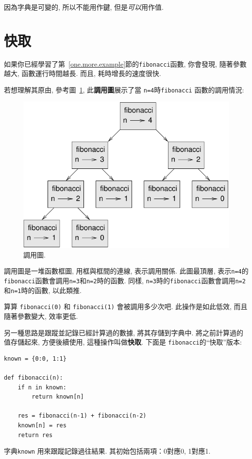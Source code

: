 \documentclass[10pt]{book}
\begin{document}
因為字典是可變的, 所以不能用作鍵, 
但是{\em 可以}用作值. 

\section{快取}
\label{memoize}

如果你已經學習了第~\ref{one.more.example}節的{\tt fibonacci}函數, 
你會發現, 隨著參數越大, 函數運行時間越長. 而且, 耗時增長的速度很快. 

若想理解其原由, 參考圖~\ref{fig.fibonacci}, 此{\bf 調用圖}展示了當
{\tt n=4}時{\tt fibonacci} 函數的調用情況:
\begin{figure}
\centerline
{\includegraphics[scale=0.7]{figs/fibonacci.pdf}}
\caption{調用圖.}
\label{fig.fibonacci}
\end{figure}
調用圖是一堆函數框圖, 用框與框間的連線, 表示調用關係. 
此圖最頂層, 表示{\tt n=4}的{\tt fibonacci}函數會調用{\tt n=3}和{\tt n=2}時的函數. 
同樣, {\tt n=3}時的{\tt fibonacci}函數會調用{\tt n=2}和{\tt n=1}時的函數, 
以此類推. 

算算 {\tt fibonacci(0)} 和 {\tt fibonacci(1)} 會被調用多少次吧. 
此操作是如此低效, 而且隨著參數變大, 效率更低. 

另一種思路是跟蹤並記錄已經計算過的數據, 將其存儲到字典中. 
將之前計算過的值存儲起來, 方便後續使用, 這種操作叫做{\bf 快取}.
下面是 {\tt fibonacci}的``快取''版本:

\begin{verbatim}
known = {0:0, 1:1}

def fibonacci(n):
    if n in known:
        return known[n]

    res = fibonacci(n-1) + fibonacci(n-2)
    known[n] = res
    return res
\end{verbatim}
%
字典{\tt known} 用來跟蹤記錄過往結果. 
其初始包括兩項：0對應0, 1對應1.
\end{document}
